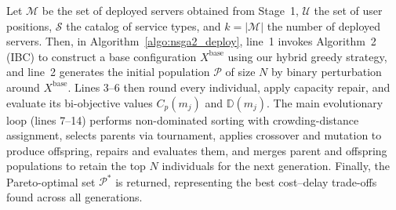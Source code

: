 \documentclass[10pt, conference, letterpaper]{IEEEtran}
\begin{document}

Let $\mathcal{M}$ be the set of deployed servers obtained from Stage~1,
  $\mathcal{U}$ the set of user positions,
  $\mathcal{S}$ the catalog of service types, and
  $k=|\mathcal{M}|$ the number of deployed servers.
  Then, in Algorithm~\ref{algo:nsga2_deploy}, line~1 invokes Algorithm~2 (IBC) to construct a base configuration
  $X^{\text{base}}$ using our hybrid greedy strategy, and line~2 generates the initial population $\mathcal{P}$ of size
  $N$ by binary perturbation around $X^{\text{base}}$. Lines 3--6 then round every individual, apply capacity repair,
  and evaluate its bi-objective values $C_{p}(m_{j})$ and $\mathbb{D}(m_{j})$. The main evolutionary loop (lines 7--14)
  performs non-dominated sorting with crowding-distance assignment, selects parents via tournament, applies crossover
  and mutation to produce offspring, repairs and evaluates them, and merges parent and offspring populations to retain
  the top $N$ individuals for the next generation. Finally, the Pareto-optimal set $\mathcal{P}^{*}$ is returned,
  representing the best cost--delay trade-offs found across all generations.
\end{document}
